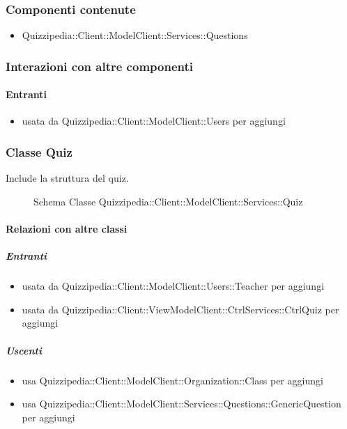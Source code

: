 \subsubsection{Componenti contenute}
\begin{itemize}
\item Quizzipedia::Client::ModelClient::Services::Questions
\end{itemize}
\subsubsection{Interazioni con altre componenti}
\paragraph{Entranti}
\begin{itemize}
\item usata da Quizzipedia::Client::ModelClient::Users per aggiungi
\end{itemize}
\subsubsection{Classe Quiz}
Include la struttura del quiz.
\begin{figure}[H]
\centering
\noindent{}
\caption[Schema Classe Quiz]{Schema Classe Quizzipedia::Client::ModelClient::Services::Quiz}
\end{figure}
\paragraph{Relazioni con altre classi}
\subparagraph{Entranti}
\begin{itemize}
\item usata da Quizzipedia::Client::ModelClient::Users::Teacher per aggiungi
\item usata da Quizzipedia::Client::ViewModelClient::CtrlServices::CtrlQuiz per aggiungi
\end{itemize}
\subparagraph{Uscenti}
\begin{itemize}
\item usa Quizzipedia::Client::ModelClient::Organization::Class per aggiungi
\item usa Quizzipedia::Client::ModelClient::Services::Questions::GenericQuestion per aggiungi
\end{itemize}
